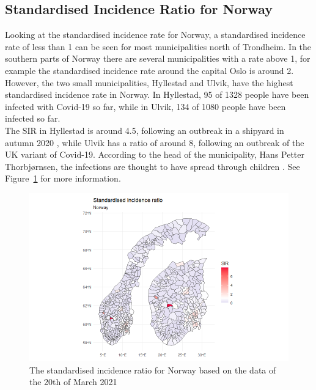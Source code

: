 \subsection{Standardised Incidence Ratio for Norway}
Looking at the standardised incidence rate for Norway, a standardised incidence rate of less than 1 can be seen for most municipalities north of Trondheim. In the southern parts of Norway there are several municipalities with a rate above 1, for example the standardised incidence rate around the capital Oslo is around 2. However, the two small municipalities, Hyllestad and Ulvik, have the highest standardised incidence rate in Norway. In Hyllestad, 95 of 1328 people have been infected with Covid-19 so far, while in Ulvik, 134 of 1080 people have been infected so far. \\
The SIR in Hyllestad is around 4.5, following an outbreak in a shipyard in autumn 2020 \cite{newspaper1}, while Ulvik has a ratio of around 8, following an outbreak of the UK variant of Covid-19. According to the head of the municipality, Hans Petter Thorbjørnsen, the infections are thought to have spread through children \cite{newspaper2}. See Figure~\ref{sirnorway} for more information.
%   
\begin{figure}[H]
  \centering
  \includegraphics[width = 1.2\textwidth]{sir_norway.png}
  \caption{The standardised incidence ratio for Norway based on the data of the 20th of March 2021}
  \label{sirnorway}
\end{figure}
